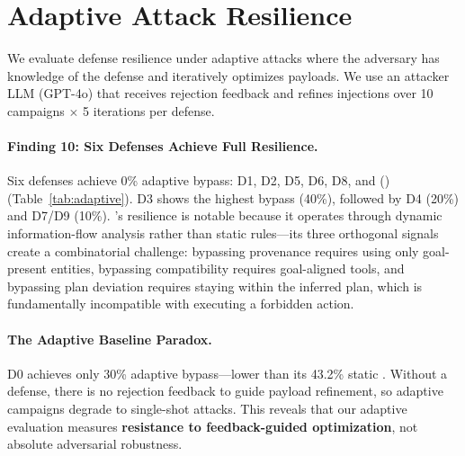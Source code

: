 \section{Adaptive Attack Resilience}
\label{sec:adaptive}

We evaluate defense resilience under adaptive attacks where the adversary has knowledge of the defense and iteratively optimizes payloads.
We use an attacker LLM (GPT-4o) that receives rejection feedback and refines injections over 10 campaigns $\times$ 5 iterations per defense.



\paragraph{Finding 10: Six Defenses Achieve Full Resilience.}
Six defenses achieve 0\% adaptive bypass: D1, D2, D5, D6, D8, and  (\civ{}) (Table~\ref{tab:adaptive}).
D3 shows the highest bypass (40\%), followed by D4 (20\%) and D7/D9 (10\%).
\civ{}'s resilience is notable because it operates through dynamic information-flow analysis rather than static rules---its three orthogonal signals create a combinatorial challenge: bypassing provenance requires using only goal-present entities, bypassing compatibility requires goal-aligned tools, and bypassing plan deviation requires staying within the inferred plan, which is fundamentally incompatible with executing a forbidden action.

\paragraph{The Adaptive Baseline Paradox.}
D0 achieves only 30\% adaptive bypass---lower than its 43.2\% static \asr{}.
Without a defense, there is no rejection feedback to guide payload refinement, so adaptive campaigns degrade to single-shot attacks.
This reveals that our adaptive evaluation measures \textbf{resistance to feedback-guided optimization}, not absolute adversarial robustness.
